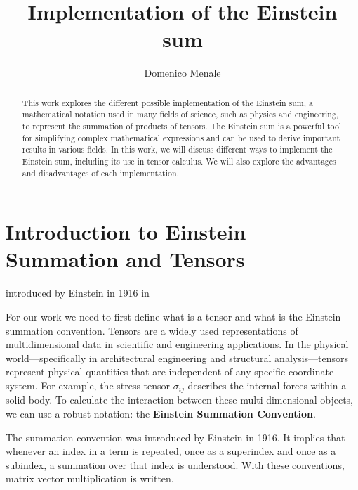 \documentclass[binding=0.6cm]{sapthesis}
\title{Implementation of the Einstein sum}
\author{Domenico Menale}
\begin{document}
\frontmatter
\maketitle
\dedication{Da grandi poteri,\\ derivano grandi responsabilità.}
\begin{abstract}
	This work explores the different possible implementation of the Einstein sum, a mathematical notation used in many fields of science, such as physics and engineering, to represent the summation of products of tensors. The Einstein sum is a powerful tool for simplifying complex mathematical expressions and can be used to derive important results in various fields. In this work, we will discuss different ways to implement the Einstein sum, including its use in tensor calculus. We will also explore the advantages and disadvantages of each implementation.
\end{abstract}

\tableofcontents

\mainmatter

 
\chapter{Introduction to Einstein Summation and Tensors}

introduced by Einstein in 1916 in \cite{...}

For our work we need to first define what is a tensor and what is the Einstein summation convention.
Tensors are a widely used representations of multidimensional data in scientific and engineering applications.\cite{Klaus2023CompilingTE}
In the physical world—specifically in architectural engineering and structural analysis—tensors represent physical quantities that are independent
of any specific coordinate system. For example, the stress tensor $\sigma_{ij}$ describes the internal forces within a solid body.
To calculate the interaction between these multi-dimensional objects, we can use a robust notation: the \textbf{Einstein Summation Convention}.

The summation convention was
introduced by Einstein in 1916. It implies that whenever an index in a term is repeated,
once as a superindex and once as a subindex, a summation over that index is understood. With
these conventions, matrix vector multiplication is written.\cite{AHLANDER20021007}
\end{document}

